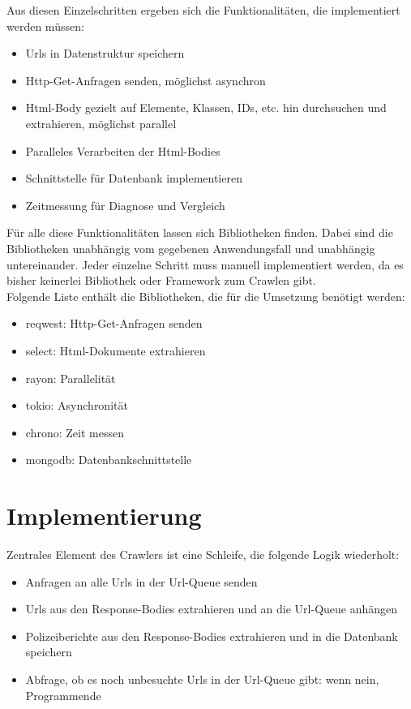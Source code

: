 Aus diesen Einzelschritten ergeben sich die Funktionalitäten, die
implementiert werden müssen:
\begin{itemize}
	\item Urls in Datenstruktur speichern
	\item Http-Get-Anfragen senden, möglichst asynchron
	\item Html-Body gezielt auf Elemente, Klassen, IDs, etc. hin durchsuchen und
	      extrahieren, möglichst parallel
	\item Paralleles Verarbeiten der Html-Bodies
	\item Schnittstelle für Datenbank implementieren
	\item Zeitmessung für Diagnose und Vergleich
\end{itemize}

Für alle diese Funktionalitäten lassen sich Bibliotheken finden. Dabei sind
die Bibliotheken unabhängig vom gegebenen Anwendungsfall und unabhängig
untereinander. Jeder einzelne Schritt muss manuell implementiert werden, da
es bisher keinerlei Bibliothek oder Framework zum Crawlen gibt.\\
Folgende Liste enthält die Bibliotheken, die für die Umsetzung benötigt werden:
\begin{itemize}
	\item reqwest\cite{reqwest}: Http-Get-Anfragen senden
	\item select\cite{select}: Html-Dokumente extrahieren
	\item rayon\cite{rayon}: Parallelität
	\item tokio\cite{tokio}: Asynchronität
	\item chrono\cite{chrono}: Zeit messen
	\item mongodb\cite{mongodb}: Datenbankschnittstelle
\end{itemize}


\section{Implementierung}
\label{sec:rust_implementierung}
Zentrales Element des Crawlers ist eine Schleife, die folgende Logik wiederholt:
\begin{itemize}
	\item Anfragen an alle Urls in der Url-Queue senden
	\item Urls aus den Response-Bodies extrahieren und an die Url-Queue anhängen
	\item Polizeiberichte aus den Response-Bodies extrahieren und in die
	      Datenbank speichern
	\item Abfrage, ob es noch unbesuchte Urls in der Url-Queue gibt: wenn nein,
	      Programmende
\end{itemize}

